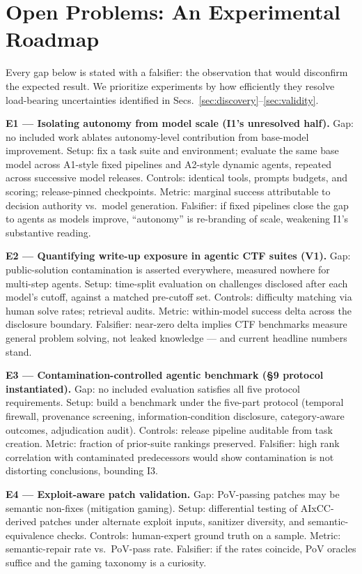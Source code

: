 \section{Open Problems: An Experimental Roadmap}
\label{sec:roadmap}

Every gap below is stated with a falsifier: the observation that would disconfirm the
expected result. We prioritize experiments by how efficiently they resolve load-bearing
uncertainties identified in Secs.~\ref{sec:discovery}--\ref{sec:validity}.

\textbf{E1 --- Isolating autonomy from model scale (I1's unresolved half).}
Gap: no included work ablates autonomy-level contribution from base-model improvement.
Setup: fix a task suite and environment; evaluate the same base model across A1-style fixed
pipelines and A2-style dynamic agents, repeated across successive model releases.
Controls: identical tools, prompts budgets, and scoring; release-pinned checkpoints.
Metric: marginal success attributable to decision authority vs.\ model generation.
Falsifier: if fixed pipelines close the gap to agents as models improve, ``autonomy'' is
re-branding of scale, weakening I1's substantive reading.

\textbf{E2 --- Quantifying write-up exposure in agentic CTF suites (V1).}
Gap: public-solution contamination is asserted everywhere, measured nowhere for multi-step
agents. Setup: time-split evaluation on challenges disclosed after each model's cutoff, against
a matched pre-cutoff set. Controls: difficulty matching via human solve rates; retrieval
audits. Metric: within-model success delta across the disclosure boundary.
Falsifier: near-zero delta implies CTF benchmarks measure general problem solving, not leaked
knowledge --- and current headline numbers stand.

\textbf{E3 --- Contamination-controlled agentic benchmark (§9 protocol instantiated).}
Gap: no included evaluation satisfies all five protocol requirements.
Setup: build a benchmark under the five-part protocol (temporal firewall, provenance
screening, information-condition disclosure, category-aware outcomes, adjudication audit).
Controls: release pipeline auditable from task creation. Metric: fraction of prior-suite
rankings preserved. Falsifier: high rank correlation with contaminated predecessors would show
contamination is not distorting conclusions, bounding I3.

\textbf{E4 --- Exploit-aware patch validation.}
Gap: PoV-passing patches may be semantic non-fixes (mitigation gaming). Setup: differential
testing of AIxCC-derived patches under alternate exploit inputs, sanitizer diversity, and
semantic-equivalence checks. Controls: human-expert ground truth on a sample. Metric:
semantic-repair rate vs.\ PoV-pass rate. Falsifier: if the rates coincide, PoV oracles suffice
and the gaming taxonomy is a curiosity.

